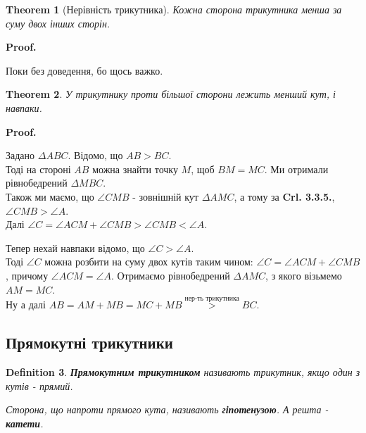 \documentclass[a4paper, 10pt]{article}
\makeatletter
\def\qed{$\blacksquare$}
\theoremstyle{theoremdd}
\newtheorem{theorem}{Theorem}[subsection]
\theoremstyle{theoremdd}
\theoremstyle{theoremdd}
\newtheorem{definition}[theorem]{Definition}
\theoremstyle{theoremdd}
\theoremstyle{theoremdd}
\theoremstyle{theoremdd}
\theoremstyle{theoremdd}
\theoremstyle{theoremdd}
\theoremstyle{theoremdd}
\renewenvironment{proof}[1][Proof.\\]{\par
\pushQED{\hfill \qed}%
\normalfont \topsep6\p@\@plus6\p@\relax
\trivlist
\item\relax
{\bfseries
#1\@addpunct{.}}\hspace\labelsep\ignorespaces
}{%
\popQED\endtrivlist\@endpefalse
}
\makeatother
\begin{document}
\begin{theorem}[Нерівність трикутника]
Кожна сторона трикутника менша за суму двох інших сторін.
\end{theorem}

\begin{proof}
Поки без доведення, бо щось важко.
\end{proof}

\begin{theorem}
У трикутнику проти більшої сторони лежить менший кут, і навпаки.
\end{theorem}

\begin{proof}
Задано $\Delta ABC$. Відомо, що $AB > BC$.\\
Тоді на стороні $AB$ можна знайти точку $M$, щоб $BM = MC$. Ми отримали рівнобедрений $\Delta MBC$.\\
Також ми маємо, що $\angle CMB$ - зовнішній кут $\Delta AMC$, а тому за \textbf{Crl. 3.3.5.}, $\angle CMB > \angle A$.\\
Далі $\angle C = \angle ACM + \angle CMB > \angle CMB < \angle A$.
\begin{figure}[H]
\centering
{}
\end{figure}
Тепер нехай навпаки відомо, що $\angle C > \angle A$.\\
Тоді $\angle C$ можна розбити на суму двох кутів таким чином: $\angle C = \angle ACM + \angle CMB$, причому $\angle ACM = \angle A$. Отримаємо рівнобедрений $\Delta AMC$, з якого візьмемо $AM = MC$.\\
Ну а далі $AB = AM + MB = MC + MB \overset{\text{нер-ть трикутника}}{>} BC$.
\end{proof}

\subsection{Прямокутні трикутники}
\begin{definition}
\textbf{Прямокутним трикутником} називають трикутник, якщо один з кутів - прямий.
\begin{figure}[H]
\centering
{}
\end{figure}
Сторона, що напроти прямого кута, називають \textbf{гіпотенузою}. А решта - \textbf{катети}.
\end{definition}
\end{document}
